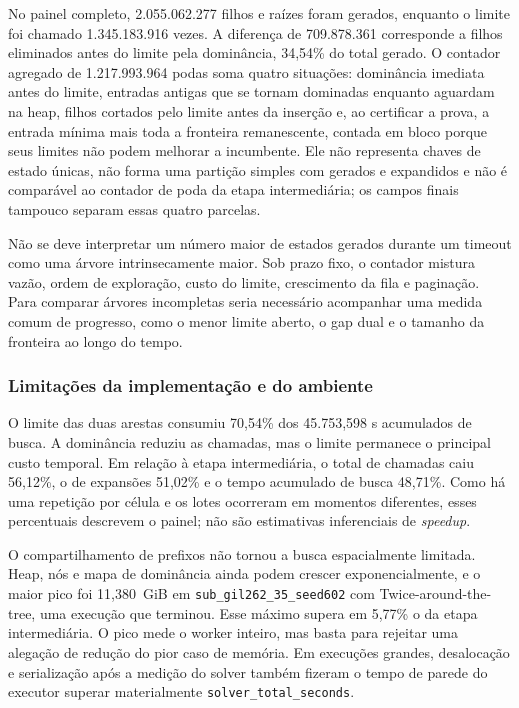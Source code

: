 \documentclass[12pt]{article}
\begin{document}
No painel completo, 2.055.062.277 filhos e raízes foram gerados, enquanto o
limite foi chamado 1.345.183.916 vezes. A diferença de 709.878.361 corresponde
a filhos eliminados antes do limite pela dominância, 34,54\% do total gerado.
O contador agregado de 1.217.993.964 podas soma quatro situações: dominância
imediata antes do limite, entradas antigas que se tornam dominadas enquanto
aguardam na heap, filhos cortados pelo limite antes da inserção e, ao certificar
a prova, a entrada mínima mais toda a fronteira remanescente, contada em bloco
porque seus limites não podem melhorar a incumbente. Ele não representa chaves
de estado únicas, não forma uma partição simples com gerados e expandidos e não é
comparável ao contador de poda da etapa intermediária; os campos finais tampouco
separam essas quatro parcelas.

Não se deve interpretar um número maior de estados gerados durante um timeout
como uma árvore intrinsecamente maior. Sob prazo fixo, o contador mistura vazão,
ordem de exploração, custo do limite, crescimento da fila e paginação. Para
comparar árvores incompletas seria necessário acompanhar uma medida comum de
progresso, como o menor limite aberto, o gap dual e o tamanho da fronteira ao
longo do tempo.

\subsubsection{Limitações da implementação e do ambiente}

O limite das duas arestas consumiu 70,54\% dos 45.753,598 s acumulados de busca.
A dominância reduziu as chamadas, mas o limite permanece o principal custo
temporal. Em relação à etapa intermediária, o total de chamadas caiu 56,12\%, o de
expansões 51,02\% e o tempo acumulado de busca 48,71\%. Como há uma repetição por
célula e os lotes ocorreram em momentos diferentes, esses percentuais descrevem
o painel; não são estimativas inferenciais de \textit{speedup}.

O compartilhamento de prefixos não tornou a busca espacialmente limitada. Heap,
nós e mapa de dominância ainda podem crescer exponencialmente, e o maior pico
foi 11,380~GiB em \texttt{sub\_gil262\_35\_seed602} com
Twice-around-the-tree, uma execução que terminou. Esse máximo supera em 5,77\%
o da etapa intermediária. O pico mede o worker inteiro, mas basta para rejeitar uma
alegação de redução do pior caso de memória. Em execuções grandes, desalocação e
serialização após a medição do solver também fizeram o tempo de parede do
executor superar materialmente \texttt{solver\_total\_seconds}.
\end{document}
